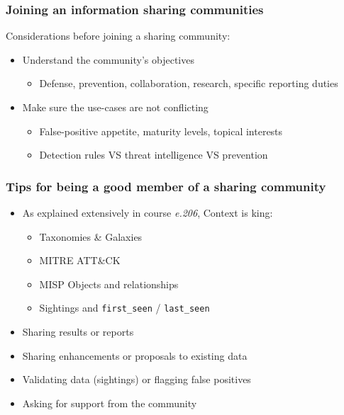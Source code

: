 \begin{frame}
    \frametitle{Joining an information sharing communities}
    Considerations before joining a sharing community:
    \begin{itemize}
        \item Understand the community's objectives
        \begin{itemize}
            \item Defense, prevention, collaboration, research, specific reporting duties
        \end{itemize}
        \item Make sure the use-cases are not conflicting
        \begin{itemize}
            \item False-positive appetite, maturity levels, topical interests
            \item Detection rules VS threat intelligence VS prevention
        \end{itemize}
    \end{itemize}
\end{frame}

\begin{frame}
    \frametitle{Tips for being a good member of a sharing community}
    \begin{itemize}
        \item As explained extensively in course \textit{e.206}, Context is king:
        \begin{itemize}
            \item Taxonomies \& Galaxies
            \item MITRE ATT\&CK
            \item MISP Objects and relationships
            \item Sightings and \texttt{first\_seen} / \texttt{last\_seen}
        \end{itemize}
        \item Sharing results or reports
        \item Sharing enhancements or proposals to existing data
        \item Validating data (sightings) or flagging false positives
        \item Asking for support from the community
    \end{itemize}
\end{frame}

